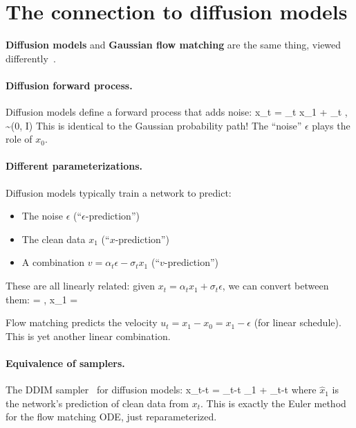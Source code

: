 \documentclass[11pt]{article}
\begin{document}
\section{The connection to diffusion models}

\textbf{Diffusion models} and \textbf{Gaussian flow matching} are the same thing, viewed differently~\cite{gao2024diffusion}.

\paragraph{Diffusion forward process.} Diffusion models define a forward process that adds noise:
\beq
x_t = \alpha_t x_1 + \sigma_t \epsilon, \quad \epsilon \sim {}(0, I)
\eeq
This is identical to the Gaussian probability path! The ``noise'' $\epsilon$ plays the role of $x_0$.

\paragraph{Different parameterizations.} Diffusion models typically train a network to predict:
\begin{itemize}
\item The noise $\epsilon$ (``$\epsilon$-prediction'')
\item The clean data $x_1$ (``$x$-prediction'')
\item A combination $v = \alpha_t \epsilon - \sigma_t x_1$ (``$v$-prediction'')
\end{itemize}

These are all linearly related: given $x_t = \alpha_t x_1 + \sigma_t \epsilon$, we can convert between them:
\beq
\epsilon = , \quad x_1 = 
\eeq

Flow matching predicts the velocity $u_t = x_1 - x_0 = x_1 - \epsilon$ (for linear schedule). This is yet another linear combination.

\paragraph{Equivalence of samplers.} The DDIM sampler~\cite{song2020denoising} for diffusion models:
\beq
x_{t-\Delta t} = \alpha_{t-\Delta t} _1 + \sigma_{t-\Delta t} \hat{\epsilon}
\eeq
where $\hat{x}_1$ is the network's prediction of clean data from $x_t$. This is exactly the Euler method for the flow matching ODE, just reparameterized.
\end{document}
